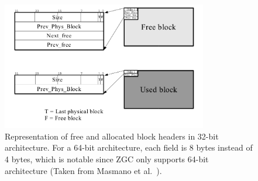 \begin{figure}[H]
    \centering
    \includegraphics[width=0.80\textwidth]{figures/blockheader_reference.png}
    \caption{Representation of free and allocated block headers in 32-bit architecture. For a 64-bit architecture, each field is 8 bytes instead of 4 bytes, which is notable since ZGC only supports 64-bit architecture (Taken from Masmano et al.~\cite{TLSF}).}
    \label{fig:blockheader_reference}
\end{figure}

